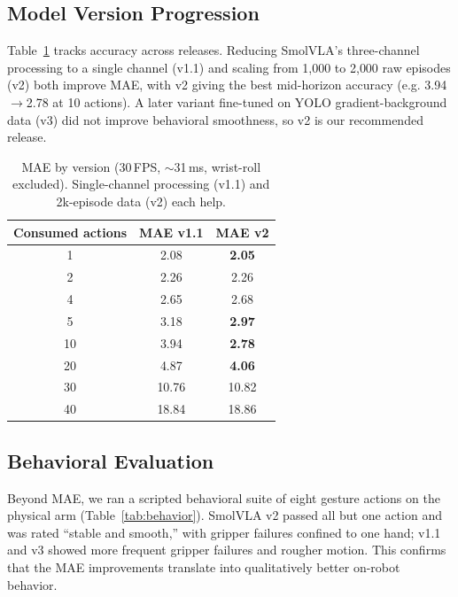\documentclass[blind]{gtac}
\begin{document}
\subsection{Model Version Progression}

Table~\ref{tab:versions} tracks accuracy across releases. Reducing SmolVLA's
three-channel processing to a single channel (v1.1) and scaling from 1{,}000 to
2{,}000 raw episodes (v2) both improve MAE, with v2 giving the best mid-horizon
accuracy (e.g. 3.94$\rightarrow$2.78 at 10 actions). A later variant fine-tuned
on YOLO gradient-background data (v3) did not improve behavioral
smoothness, so v2 is our recommended release.

\begin{table}[H]
\centering
\caption{MAE by version (30\,FPS, $\sim$31\,ms, wrist-roll excluded).
Single-channel processing (v1.1) and 2k-episode data (v2) each help.}
\label{tab:versions}
\footnotesize
\begin{tabular}{@{}ccc@{}}
\toprule
Consumed actions & MAE v1.1 & MAE v2 \\
\midrule
1  & 2.08 & \textbf{2.05} \\
2  & 2.26 & 2.26 \\
4  & 2.65 & 2.68 \\
5  & 3.18 & \textbf{2.97} \\
10 & 3.94 & \textbf{2.78} \\
20 & 4.87 & \textbf{4.06} \\
30 & 10.76 & 10.82 \\
40 & 18.84 & 18.86 \\
\bottomrule
\end{tabular}
\end{table}

\subsection{Behavioral Evaluation}

Beyond MAE, we ran a scripted behavioral suite of eight gesture actions on the
physical arm (Table~\ref{tab:behavior}). SmolVLA v2 passed all but one action and
was rated ``stable and smooth,'' with gripper failures confined to one hand;
v1.1 and v3 showed more frequent gripper failures and rougher motion. This
confirms that the MAE improvements translate into qualitatively better on-robot
behavior.
\end{document}
